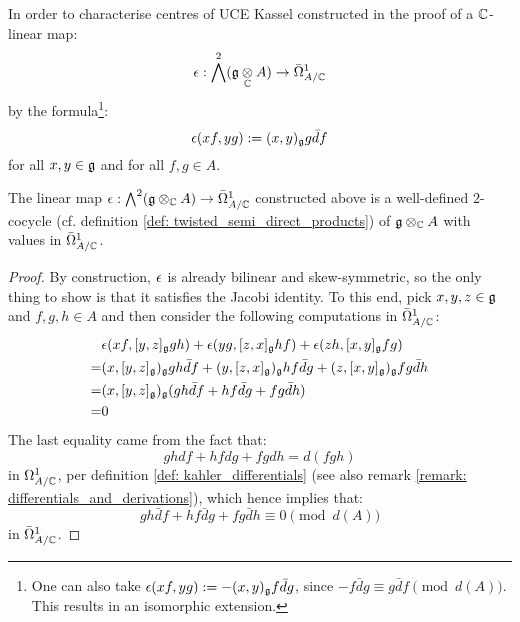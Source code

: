         In order to characterise centres of UCE Kassel constructed in the proof of \cite[Theorem 3.3(iii)]{kassel_universal_central_extensions_of_lie_algebras} a $\mathbb{C}$-linear map:
            $$\e: \bigwedge^2 (\g \tensor_{\bbC} A) \to \bar{\Omega}^1_{A/\bbC}$$
        by the formula\footnote{One can also take $\epsilon(x f, y g) := -(x, y)_{\mathfrak{g}} f \bar{d}g$, since $-f \bar{d}g \equiv g \bar{d}f \pmod{d(A)}$. This results in an isomorphic extension.}:
            $$\epsilon(x f, y g) := (x, y)_{\mathfrak{g}} g \bar{d}f$$
        for all $x, y \in \mathfrak{g}$ and for all $f, g \in A$.
        \begin{lemma} \label{lemma: lie_brackets_on_UCEs_of_current_algebras}
            The linear map $\e: \bigwedge^2 (\g \tensor_{\bbC} A) \to \bar{\Omega}^1_{A/\bbC}$ constructed above is a well-defined $2$-cocycle (cf. definition \ref{def: twisted_semi_direct_products}) of $\g \tensor_{\bbC} A$ with values in $\bar{\Omega}^1_{A/\mathbb{C}}$.
        \end{lemma}
            \begin{proof}
                By construction, $\epsilon$ is already bilinear and skew-symmetric, so the only thing to show is that it satisfies the Jacobi identity. To this end, pick $x, y, z \in \mathfrak{g}$ and $f, g, h \in A$ and then consider the following computations in $\bar{\Omega}^1_{A/\mathbb{C}}$:
                    $$
                        \begin{aligned}
                            & \epsilon(xf, [y, z]_{\mathfrak{g}} gh) + \epsilon(yg, [z, x]_{\mathfrak{g}} hf) + \epsilon(zh, [x, y]_{\mathfrak{g}} fg)
                            \\
                            = & (x, [y, z]_{\mathfrak{g}})_{\mathfrak{g}} gh \bar{d}f + (y, [z, x]_{\mathfrak{g}})_{\mathfrak{g}} hf \bar{d}g + (z, [x, y]_{\mathfrak{g}})_{\mathfrak{g}} fg \bar{d}h
                            \\
                            = & (x, [y, z]_{\mathfrak{g}})_{\mathfrak{g}} ( gh \bar{d}f + hf \bar{d}g + fg\bar{d}h )
                            \\
                            = & 0
                        \end{aligned}
                    $$
                The last equality came from the fact that:
                    $$gh df + hf dg + fg dh = d(fgh)$$
                in $\Omega^1_{A/\mathbb{C}}$, per definition \ref{def: kahler_differentials} (see also remark \ref{remark: differentials_and_derivations}), which hence implies that:
                    $$gh \bar{d}f + hf \bar{d}g + fg \bar{d}h \equiv 0 \pmod{d(A)}$$
                in $\bar{\Omega}^1_{A/\mathbb{C}}$.
            \end{proof}
